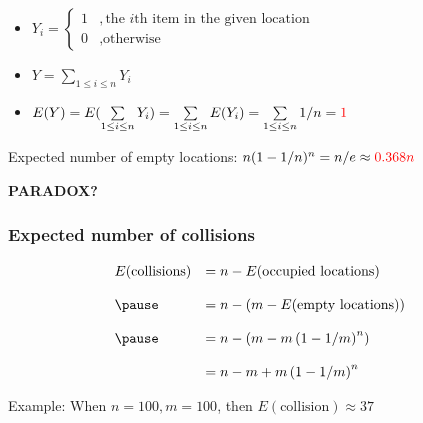 \documentclass[UTF8,11pt]{beamer}
\begin{document}
\begin{frame}
\begin{center}
\end{center}
\pause
\begin{block}{}
	\begin{center}
		\begin{itemize}
			\pause
			\item $Y_i=\left\lbrace \begin{array}{ll}
			1&,\text{the }i\text{th item in the given location}\\
			0&,\text{otherwise}
			\end{array}\right. $
			\pause
			\item $Y=\sum\limits_{1\le i\le n}{Y_i}$
			\pause
			\item $E(Y)=E(\sum\limits_{1\le i\le n}{Y_i})=\sum\limits_{1\le i\le n}{E(Y_i)}=\sum\limits_{1\le i\le n}{1/n}={\color{red}1}$
		\end{itemize}
	\end{center}
\end{block}

\pause
\begin{block}{Expected number of empty locations: $n(1-1/n)^n=n/e \approx {\color{red}0.368n}$}
\end{block}


\begin{center}
	\pause
	\textbf{\LARGE{PARADOX?}}
	
	\pause
\end{center}
\end{frame}
\begin{frame}[t]
\frametitle{Expected number of collisions}
\begin{center}
	\begin{block}{}
		\pause
		\[
			\begin{array}{ll}
				E(\text{collisions})&=n-E(\text{occupied locations})\\\\
			\pause	&=n-\left(m-E(\text{empty locations})\right)\\\\
			\pause	&=n-\left(m-m\left(1-1/m\right)^n\right)\\\\
					&=n-m+m\left(1-1/m\right)^n
			\end{array}
		\]
	\end{block}
	\pause
	\begin{block}{Example:}
		When	$n=100, m=100$,  then $E(\text{collision})\approx37$
	\end{block}
\end{center}
\end{frame}
\end{document}
